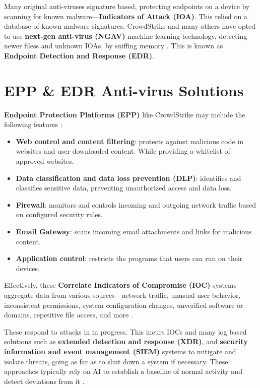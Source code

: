 Many original anti-viruses signature based, protecting endpoints on a device by scanning for known malware---\textbf{Indicators of Attack (IOA)}.
This relied on a database of known malware signatures. CrowdStrike and many others
have opted to use \textbf{next-gen anti-virus (NGAV)} machine learning technology, detecting newer filess and unknown IOAs, by sniffing memory \cite{ionescu_kernel_access_2024}.
This is known as \textbf{Endpoint Detection and Response (EDR)}.

\newpage

\section{EPP \& EDR Anti-virus Solutions}
\textbf{Endpoint Protection Platforms (EPP)} like CrowdStrike may include the following features \cite{ibm_endpoint_security}:
\begin{itemize}
    \item \textbf{Web control and content filtering}: protects against malicious code in websites and
          user downloaded content. While providing a whitelist of approved websites.
    \item \textbf{Data classification and data loss prevention (DLP)}: identifies and classifies sensitive data,
          preventing unauthorized access and data loss.
    \item \textbf{Firewall}: monitors and controls incoming and outgoing network traffic based on configured security rules.
    \item \textbf{Email Gateway}: scans incoming email attachments and links for malicious content.
    \item \textbf{Application control}: restricts the programs that users can run on their devices.
\end{itemize}

Effectively, these \textbf{Correlate Indicators of Compromise (IOC)} systems aggregate data from various sources---network traffic, unusual user behavior,
inconsistent permissions, system configuration changes, unverified software or domains, repetitive file access, and more \cite{microsoft_ioc}.

These respond to attacks in in progress. This incurs IOCs and many log based solutions such as
\textbf{extended detection and response (XDR)}, and \textbf{security information and event management (SIEM)} systems to mitigate and isolate threats, going
as far as to shut down a system if necessary. These approaches typically rely on AI to establish a baseline of normal activity and detect deviations from it \cite{microsoft_ioc}.

